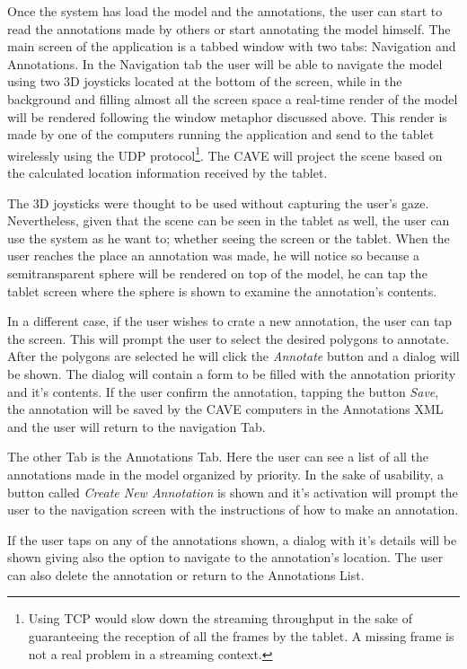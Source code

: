 Once the system has load the model and the annotations, the user can start to read the annotations made by others or start annotating the model himself. The main screen of the application is a tabbed window with two tabs: Navigation and Annotations. In the Navigation tab the user will be able to navigate the model using two 3D joysticks located at the bottom of the screen, while in the background and filling almost all the screen space a real-time render of the model will be rendered following the window metaphor discussed above. This render is made by one of the computers running the application and send to the tablet wirelessly using the UDP protocol\footnote{Using TCP would slow down the streaming throughput in the sake of guaranteeing the reception of all the frames by the tablet. A missing frame is not a real problem in a streaming context.}. The CAVE will project the scene based on the calculated location information received by the tablet.

The 3D joysticks were thought to be used without capturing the user's gaze. Nevertheless, given that the scene can be seen in the tablet as well, the user can use the system as he want to; whether seeing the screen or the tablet. When the user reaches the place an annotation was made, he will notice so because a semitransparent sphere will be rendered on top of the model, he can tap the tablet screen where the sphere is shown to examine the annotation's contents. 

In a different case, if the user wishes to crate a new annotation, the user can tap the screen. This will prompt the user to select the desired polygons to annotate. After the polygons are selected he will click the \emph{Annotate} button and a dialog will be shown. The dialog will contain a form to be filled with the annotation priority and it's contents. If the user confirm the annotation, tapping the button \emph{Save}, the annotation will be saved by the CAVE computers in the Annotations XML and the user will return to the navigation Tab. 

The other Tab is the Annotations Tab. Here the user can see a list of all the annotations made in the model organized by priority. In the sake of usability, a button called \emph{Create New Annotation} is shown and it's activation will prompt the user to the navigation screen with the instructions of how to make an annotation.

If the user taps on any of the annotations shown, a dialog with it's details will be shown giving also the option to navigate to the annotation's location. The user can also delete the annotation or return to the Annotations List.
